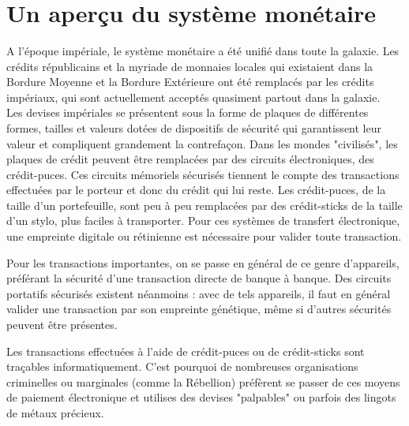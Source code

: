 \documentclass{article}
\begin{document}
\title{\vspace{-0.5cm}{\Huge Et pour quelques crédits de plus\ldots} \vspace{-1cm}}

\date{}

\maketitle

\section*{Un aperçu du système monétaire}
A l'époque impériale, le système monétaire a été unifié dans toute la galaxie. Les crédits républicains et la myriade de monnaies locales qui existaient dans la Bordure Moyenne et la Bordure Extérieure ont été remplacés par les crédits impériaux, qui sont actuellement acceptés quasiment partout dans la galaxie. \\

Les devises impériales se présentent sous la forme de plaques de différentes formes, tailles et valeurs dotées de dispositifs de sécurité qui garantissent leur valeur et compliquent grandement la contrefaçon. Dans les mondes "civilisés", les plaques de crédit peuvent être remplacées par des circuits électroniques, des crédit-puces. Ces circuits mémoriels sécurisés tiennent le compte des transactions effectuées par le porteur et donc du crédit qui lui reste. Les crédit-puces, de la taille d'un portefeuille, sont peu à peu remplacées par des crédit-sticks de la taille d'un stylo, plus faciles à transporter. Pour ces systèmes de transfert électronique, une empreinte digitale ou rétinienne est nécessaire pour valider toute transaction.

Pour les transactions importantes, on se passe en général de ce genre d'appareils, préférant la sécurité d'une transaction directe de banque à banque. Des circuits portatifs sécurisés existent néanmoins : avec de tels appareils, il faut en général valider une transaction par son empreinte génétique, même si d'autres sécurités peuvent être présentes. 

Les transactions effectuées à l'aide de crédit-puces ou de crédit-sticks sont traçables informatiquement. C'est pourquoi de nombreuses organisations criminelles ou marginales (comme la Rébellion) préfèrent se passer de ces moyens de paiement électronique et utilises des devises "palpables" ou parfois des lingots de métaux précieux. 
\end{document}
